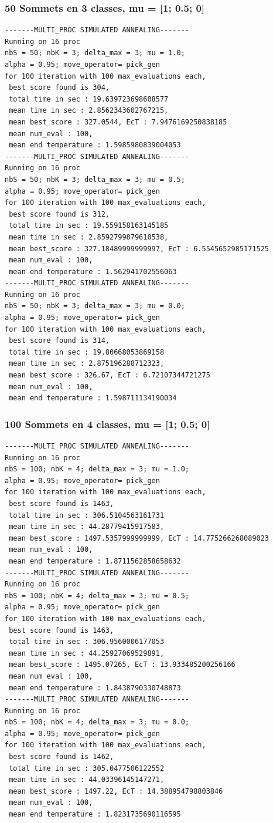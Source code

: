 \documentclass[a4paper]{article}
\begin{document}
\subsubsection{50 Sommets en 3 classes, mu = [1; 0.5; 0]}
\begin{verbatim}
-------MULTI_PROC SIMULATED ANNEALING-------
Running on 16 proc
nbS = 50; nbK = 3; delta_max = 3; mu = 1.0;
alpha = 0.95; move_operator= pick_gen
for 100 iteration with 100 max_evaluations each, 
 best score found is 304,
 total time in sec : 19.639723698608577
 mean time in sec : 2.8562343602767215,
 mean best_score : 327.0544, EcT : 7.9476169250838185
 mean num_eval : 100,
 mean end temperature : 1.5985980839004053
-------MULTI_PROC SIMULATED ANNEALING-------
Running on 16 proc
nbS = 50; nbK = 3; delta_max = 3; mu = 0.5;
alpha = 0.95; move_operator= pick_gen
for 100 iteration with 100 max_evaluations each, 
 best score found is 312,
 total time in sec : 19.559158163145185
 mean time in sec : 2.8592799879610538,
 mean best_score : 327.18489999999997, EcT : 6.5545652985171525
 mean num_eval : 100,
 mean end temperature : 1.562941702556063
-------MULTI_PROC SIMULATED ANNEALING-------
Running on 16 proc
nbS = 50; nbK = 3; delta_max = 3; mu = 0.0;
alpha = 0.95; move_operator= pick_gen
for 100 iteration with 100 max_evaluations each, 
 best score found is 314,
 total time in sec : 19.80668053869158
 mean time in sec : 2.875196288712323,
 mean best_score : 326.67, EcT : 6.72107344721275
 mean num_eval : 100,
 mean end temperature : 1.598711134190034
\end{verbatim}
\subsubsection{100 Sommets en 4 classes, mu = [1; 0.5; 0]}
\begin{verbatim}
-------MULTI_PROC SIMULATED ANNEALING-------
Running on 16 proc
nbS = 100; nbK = 4; delta_max = 3; mu = 1.0;
alpha = 0.95; move_operator= pick_gen
for 100 iteration with 100 max_evaluations each, 
 best score found is 1463,
 total time in sec : 306.5104563161731
 mean time in sec : 44.28779415917583,
 mean best_score : 1497.5357999999999, EcT : 14.775266268089023
 mean num_eval : 100,
 mean end temperature : 1.8711562858658632
-------MULTI_PROC SIMULATED ANNEALING-------
Running on 16 proc
nbS = 100; nbK = 4; delta_max = 3; mu = 0.5;
alpha = 0.95; move_operator= pick_gen
for 100 iteration with 100 max_evaluations each, 
 best score found is 1463,
 total time in sec : 306.9560006177053
 mean time in sec : 44.25927069529891,
 mean best_score : 1495.07265, EcT : 13.933485200256166
 mean num_eval : 100,
 mean end temperature : 1.8438790330748873
-------MULTI_PROC SIMULATED ANNEALING-------
Running on 16 proc
nbS = 100; nbK = 4; delta_max = 3; mu = 0.0;
alpha = 0.95; move_operator= pick_gen
for 100 iteration with 100 max_evaluations each, 
 best score found is 1462,
 total time in sec : 305.0477506122552
 mean time in sec : 44.03396145147271,
 mean best_score : 1497.22, EcT : 14.388954798803846
 mean num_eval : 100,
 mean end temperature : 1.8231735690116595
\end{verbatim}
\end{document}
